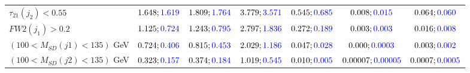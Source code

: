 \begin{landscape}
\begin{table}
\begin{tabular}{lcccccc}
			\rowcolor{black!7}$\tau_{21}(j_2)<0.55$ &$1.648;\textcolor{blue}{1.619}$ &$1.809;\textcolor{blue}{1.764}$ &$3.779;\textcolor{blue}{3.571}$&$0.545;\textcolor{blue}{0.685}$&$0.008;\textcolor{blue}{0.015}$&$0.064;\textcolor{blue}{0.060}$\\
			$FW2(j_1)>0.2$ &$1.125;\textcolor{blue}{0.724}$ &$1.243;\textcolor{blue}{0.795}$&$2.797;\textcolor{blue}{1.836}$&$0.272;\textcolor{blue}{0.189}$&$0.003;\textcolor{blue}{0.003}$&$0.016;\textcolor{blue}{0.008}$\\
			\rowcolor{black!7}$(100<M_{SD}(j1)<135)$ GeV& $0.724;\textcolor{blue}{0.406}$&$0.815;\textcolor{blue}{0.453}$&$2.029;\textcolor{blue}{1.186}$&$0.047;\textcolor{blue}{0.028}$&$0.000;\textcolor{blue}{0.0003}$&$0.003;\textcolor{blue}{0.002}$\\
			$(100<M_{SD}(j2)<135)$ GeV &$0.323;\textcolor{blue}{0.157}$ &$0.374;\textcolor{blue}{0.184}$ &$1.019;\textcolor{blue}{0.545}$&$0.010;\textcolor{blue}{0.005}$&$0.00007;\textcolor{blue}{0.00005}$&$0.0007;\textcolor{blue}{0.0005}$\\
			\bottomrule
		\end{tabular}
	\end{table}


\end{landscape}

